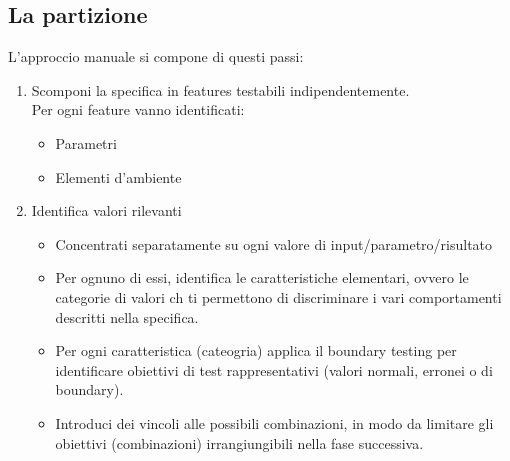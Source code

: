 \subsection{La partizione} %
L'approccio manuale si compone di questi passi:
\begin{enumerate}
    \item Scomponi la specifica in features testabili indipendentemente.
    \\ Per ogni feature vanno identificati:
    \begin{itemize}
        \item Parametri
        \item Elementi d'ambiente
    \end{itemize}
    \item Identifica valori rilevanti
    \begin{itemize}
        \item Concentrati separatamente su ogni valore di input/parametro/risultato
        \item Per ognuno di essi, identifica le caratteristiche elementari, ovvero le categorie di valori ch ti permettono di discriminare i vari comportamenti descritti nella specifica.
        \item Per ogni caratteristica (cateogria) applica il boundary testing per identificare obiettivi di test rappresentativi (valori normali, erronei o di boundary).
        \item Introduci dei vincoli alle possibili combinazioni, in modo da limitare gli obiettivi (combinazioni) irrangiungibili nella fase successiva.
    \end{itemize}
\end{enumerate}
